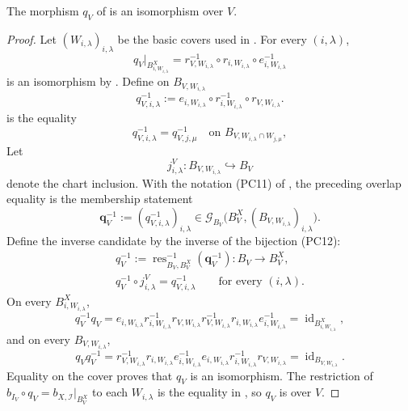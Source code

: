 \begin{proposition}
  \label{prop:nagata-global-blowup-affine-restrict}

  The morphism $q_V$ of
   is an isomorphism
  over $V$.
\end{proposition}

\begin{proof}
  Let $(W_{i,\lambda})_{i,\lambda}$ be the basic covers used in
  .  For every
  $(i,\lambda)$,
  \[
    q_V|_{B^X_{i,W_{i,\lambda}}}
      =r_{V,W_{i,\lambda}}^{-1}\circ r_{i,W_{i,\lambda}}
        \circ e_{i,W_{i,\lambda}}^{-1}
  \]
  is an isomorphism by
  .  Define on
  $B_{V,W_{i,\lambda}}$
  \[
    q_{V,i,\lambda}^{-1}:=
      e_{i,W_{i,\lambda}}\circ r_{i,W_{i,\lambda}}^{-1}
        \circ r_{V,W_{i,\lambda}}.
  \]
   is the equality
  \[
    q_{V,i,\lambda}^{-1}=q_{V,j,\mu}^{-1}
      \quad\text{on }B_{V,W_{i,\lambda}\cap W_{j,\mu}},
  \]
  Let
  \[
    j^V_{i,\lambda}\colon B_{V,W_{i,\lambda}}\hookrightarrow B_V
  \]
  denote the chart inclusion.  With the notation (PC11) of
  , the preceding overlap
  equality is the membership statement
  \[
    \mathbf q_V^{-1}:=(q_{V,i,\lambda}^{-1})_{i,\lambda}
      \in\mathscr G_{B_V}
        \bigl(B_V^X,(B_{V,W_{i,\lambda}})_{i,\lambda}\bigr).
  \]
  Define the inverse candidate by the inverse of the bijection (PC12):
  \[
  \begin{gathered}
    q_V^{-1}:=
      \operatorname{res}_{B_V,B_V^X}^{-1}(\mathbf q_V^{-1})
      \colon B_V\to B_V^X,\\
    q_V^{-1}\circ j^V_{i,\lambda}=q_{V,i,\lambda}^{-1}
      \qquad\text{for every }(i,\lambda).
  \end{gathered}
  \]
  On every
  $B^X_{i,W_{i,\lambda}}$,
  \[
    q_V^{-1}q_V
      =e_{i,W_{i,\lambda}}r_{i,W_{i,\lambda}}^{-1}
        r_{V,W_{i,\lambda}}r_{V,W_{i,\lambda}}^{-1}
        r_{i,W_{i,\lambda}}e_{i,W_{i,\lambda}}^{-1}
      =\operatorname{id}_{B^X_{i,W_{i,\lambda}}},
  \]
  and on every $B_{V,W_{i,\lambda}}$,
  \[
    q_Vq_V^{-1}
      =r_{V,W_{i,\lambda}}^{-1}r_{i,W_{i,\lambda}}
        e_{i,W_{i,\lambda}}^{-1}e_{i,W_{i,\lambda}}
        r_{i,W_{i,\lambda}}^{-1}r_{V,W_{i,\lambda}}
      =\operatorname{id}_{B_{V,W_{i,\lambda}}}.
  \]
  Equality on the cover proves that $q_V$ is an isomorphism.  The
  restriction of
  $b_{I_V}\circ q_V=b_{X,\mathcal I}|_{B_V^X}$ to each
  $W_{i,\lambda}$ is the equality in
  , so $q_V$ is over $V$.
\end{proof}

